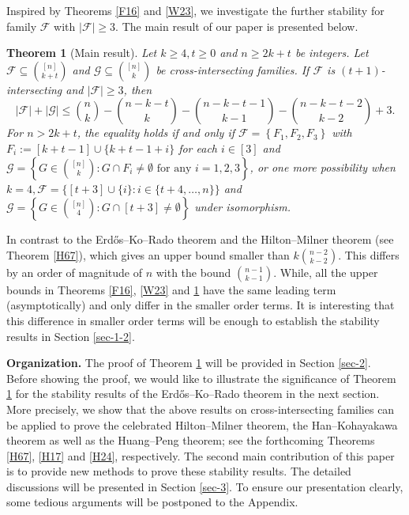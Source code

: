 \documentclass[11pt]{article}
\numberwithin{equation}{section}
\newtheorem{theorem}{Theorem}[section]
\begin{document}

Inspired by Theorems \ref{F16} and \ref{W23}, we investigate the further stability for family $\mathcal{F}$ with  $|\mathcal{F}| \geq 3$. 
The main result of our paper  is presented below. 

\begin{theorem}[Main result]  \label{51}
Let $k \geq 4, t\ge 0$ and $n \geq 2 k+t$ be integers. Let $\mathcal{F} \subseteq\binom{[n]}{k+t}$ and $\mathcal{G} \subseteq\binom{[n]}{k}$ be cross-intersecting families. If $\mathcal{F}$ is $(t+1)$-intersecting and $|\mathcal{F}| \geq 3$, then
$$
|\mathcal{F}|+|\mathcal{G}| \leq\binom{n}{k}-\binom{n-k-t}{k}-\binom{n-k-t-1}{k-1}-\binom{n-k-t-2}{k-2}+3.
$$
For $n > 2 k+t$, the equality holds if and only if $\mathcal{F}=\left\{F_1, F_2, F_3\right\}$ with $F_i:=[k+t-1]\cup \{k+t-1+i\}$ for each $i\in [3]$  and $\mathcal{G}=\left\{G \in\binom{[n]}{k}: G \cap F_i \neq\emptyset \text{ for any } i=1, 2, 3\right\}$, or  one more possibility when $k=4, \mathcal{F}=\{[t+3] \cup\{i\}: i \in\{t+4, \ldots, n\}\}$ and $\mathcal{G}=\left\{G \in\binom{[n]}{4}: G \cap[t+3] \neq \emptyset\right\}$ under isomorphism.
\end{theorem}


In contrast to the Erd\H{o}s--Ko--Rado theorem and the Hilton--Milner theorem (see Theorem \ref{H67}), which gives an upper  bound smaller than $k{n-2 \choose k-2}$. This differs by an order of magnitude of $n$ with the bound ${n-1 \choose k-1}$. 
While, all the upper bounds in Theorems \ref{F16}, \ref{W23} and \ref{51} have the same leading term (asymptotically) and only differ in the smaller order terms. It is interesting that this difference in smaller order terms will be enough to establish the stability results in Section \ref{sec-1-2}. 


\medskip 
\noindent 
{\bf Organization.} 
The proof of Theorem \ref{51} will be provided in Section \ref{sec-2}. 
Before showing the proof, we would like to illustrate the 
significance of Theorem \ref{51} for 
the stability results of the Erd\H{o}s--Ko--Rado theorem 
in the next section. 
More precisely,  
we show that the above results on cross-intersecting families can be applied to prove the celebrated Hilton--Milner theorem, the Han--Kohayakawa theorem as well as the Huang--Peng theorem; see the forthcoming Theorems \ref{H67}, \ref{H17} and \ref{H24}, respectively. 
The second main contribution of this paper is to provide new methods to prove these stability results. 
The detailed discussions will be presented in Section \ref{sec-3}. 
To ensure our presentation clearly, some tedious arguments will be postponed to the Appendix. 
\end{document}
